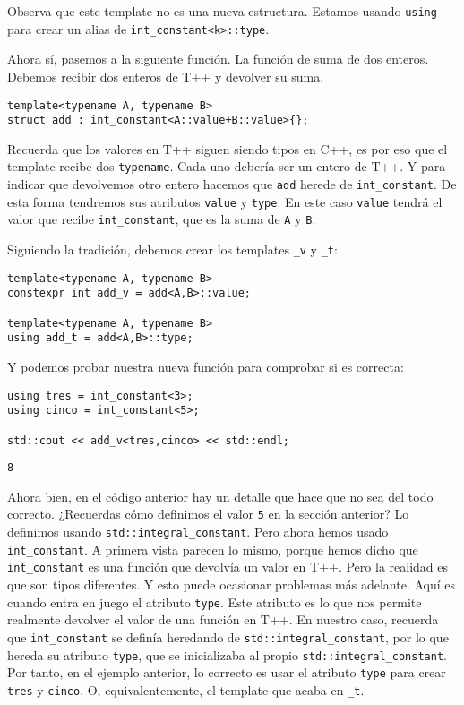 \documentclass[11pt]{article}
\begin{document}
Observa que este template no es una nueva estructura. Estamos usando \texttt{using} para crear un alias de \texttt{int\_constant<k>::type}.

Ahora sí, pasemos a la siguiente función. La función de suma de dos enteros. Debemos recibir dos enteros de T++ y devolver su suma.

\begin{verbatim}
template<typename A, typename B>
struct add : int_constant<A::value+B::value>{};
\end{verbatim}

Recuerda que los valores en T++ siguen siendo tipos en C++, es por eso que el template recibe dos \texttt{typename}. Cada uno debería ser un entero de T++. Y para indicar que devolvemos otro entero hacemos que \texttt{add} herede de \texttt{int\_constant}. De esta forma tendremos sus atributos \texttt{value} y \texttt{type}. En este caso \texttt{value} tendrá el valor que recibe \texttt{int\_constant}, que es la suma de \texttt{A} y \texttt{B}.

Siguiendo la tradición, debemos crear los templates \texttt{\_v} y \texttt{\_t}:

\begin{verbatim}
template<typename A, typename B>
constexpr int add_v = add<A,B>::value;

template<typename A, typename B>
using add_t = add<A,B>::type;
\end{verbatim}

Y podemos probar nuestra nueva función para comprobar si es correcta:

\begin{verbatim}
using tres = int_constant<3>;
using cinco = int_constant<5>;

std::cout << add_v<tres,cinco> << std::endl;
\end{verbatim}

\begin{verbatim}
8
\end{verbatim}


Ahora bien, en el código anterior hay un detalle que hace que no sea del todo correcto. ¿Recuerdas cómo definimos el valor \texttt{5} en la sección anterior? Lo definimos usando \texttt{std::integral\_constant}. Pero ahora hemos usado \texttt{int\_constant}. A primera vista parecen lo mismo, porque hemos dicho que \texttt{int\_constant} es una función que devolvía un valor en T++. Pero la realidad es que son tipos diferentes. Y esto puede ocasionar problemas más adelante. Aquí es cuando entra en juego el atributo \texttt{type}. Este atributo es lo que nos permite realmente devolver el valor de una función en T++. En nuestro caso, recuerda que \texttt{int\_constant} se definía heredando de \texttt{std::integral\_constant}, por lo que hereda su atributo \texttt{type}, que se inicializaba al propio \texttt{std::integral\_constant}. Por tanto, en el ejemplo anterior, lo correcto es usar el atributo \texttt{type} para crear \texttt{tres} y \texttt{cinco}. O, equivalentemente, el template que acaba en \texttt{\_t}.
\end{document}

